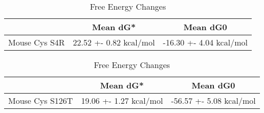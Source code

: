                                               \begin{table}[ht]
                                                \centering
                                                \begin{tabular}{|c|c|c|}
                                                \hline
                                                  & Mean dG* & Mean dG0 \\
                                                \hline
                                           Mouse Cys S4R & 22.52 +- 0.82 kcal/mol & -16.30 +- 4.04 kcal/mol \\
                                                \hline
                                                \end{tabular}
                                                \caption{Free Energy Changes}
                                                \end{table}
                                                

                                                \begin{table}[ht]
                                                  \centering
                                                  \begin{tabular}{|c|c|c|}
                                                  \hline
                                                    & Mean dG* & Mean dG0 \\
                                                  \hline
                                               Mouse Cys S126T & 19.06 +- 1.27 kcal/mol & -56.57 +- 5.08 kcal/mol \\
                                                  \hline
                                                  \end{tabular}
                                                  \caption{Free Energy Changes}
                                                  \end{table}
                                                  
                                        
